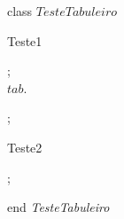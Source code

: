 {\small\sf class} $TesteTabuleiro$
\par
\kInstanceVarDef
\parlinebr
\begin{insvar}
\end{insvar}
\par
\kOperations
{}\begin{op}[e]{Teste1}%
\signature{() \Oto ()}
\parms{}
\begin{blockstmt}
 ; \\
$tab$.
\end{blockstmt};
\end{op}
\begin{op}[e]{Teste2}%
\signature{() \Oto Tabuleiro`Estado}
\parms{}
\begin{blockstmt}
 ; \\
\end{blockstmt}
\end{op}
{\small\sf end} {\it TesteTabuleiro}

